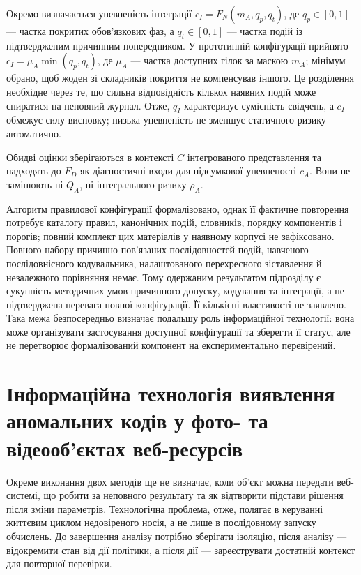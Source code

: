 Окремо визначається упевненість інтеграції $c_I=F_N(m_A,q_p,q_t)$, де $q_p\in[0,1]$ --- частка покритих обов’язкових фаз, а $q_t\in[0,1]$ --- частка подій із підтвердженим причинним попередником. У прототипній конфігурації прийнято $c_I=\mu_A\min(q_p,q_t)$, де $\mu_A$ --- частка доступних гілок за маскою $m_A$; мінімум обрано, щоб жоден зі складників покриття не компенсував іншого. Це розділення необхідне через те, що сильна відповідність кількох наявних подій може спиратися на неповний журнал. Отже, $q_I$ характеризує сумісність свідчень, а $c_I$ обмежує силу висновку; низька упевненість не зменшує статичного ризику автоматично.

Обидві оцінки зберігаються в контексті $C$ інтегрованого представлення та надходять до $F_D$ як діагностичні входи для підсумкової упевненості $c_A$. Вони не замінюють ні $Q_A$, ні інтегрального ризику $\rho_A$.

Алгоритм правилової конфігурації формалізовано, однак її фактичне повторення потребує каталогу правил, канонічних подій, словників, порядку компонентів і порогів; повний комплект цих матеріалів у наявному корпусі не зафіксовано. Повного набору причинно пов’язаних послідовностей подій, навченого послідовнісного кодувальника, налаштованого перехресного зіставлення й незалежного порівняння немає. Тому одержаним результатом підрозділу є сукупність методичних умов причинного допуску, кодування та інтеграції, а не підтверджена перевага повної конфігурації. Її кількісні властивості не заявлено. Така межа безпосередньо визначає подальшу роль інформаційної технології: вона може організувати застосування доступної конфігурації та зберегти її статус, але не перетворює формалізований компонент на експериментально перевірений.

\section{Інформаційна технологія виявлення аномальних кодів у фото- та відеооб’єктах веб-ресурсів}
\label{sec:information_technology}

Окреме виконання двох методів ще не визначає, коли об’єкт можна передати веб-системі, що робити за неповного результату та як відтворити підстави рішення після зміни параметрів. Технологічна проблема, отже, полягає в керуванні життєвим циклом недовіреного носія, а не лише в послідовному запуску обчислень. До завершення аналізу потрібно зберігати ізоляцію, після аналізу --- відокремити стан від дії політики, а після дії --- зареєструвати достатній контекст для повторної перевірки.

